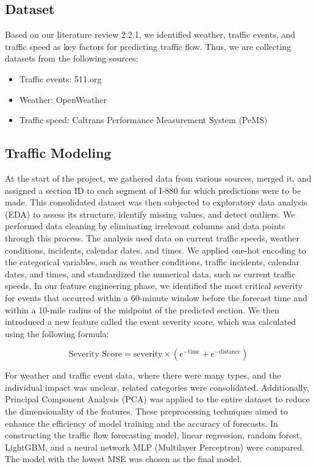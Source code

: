 \documentclass{report}
\begin{document}
\subsection{Dataset}
Based on our literature review 2.2.1, we identified weather, traffic events, and traffic speed as key factors for predicting traffic flow. Thus, we are collecting datasets from the following sources:
\begin{itemize}
    \item Traffic events: 511.org
    \item Weather: OpenWeather
    \item Traffic speed: Caltrans Performance Measurement System (PeMS)
\end{itemize}

\subsection{Traffic Modeling}
At the start of the project, we gathered data from various sources, merged it, and assigned a section ID to each segment of I-880 for which predictions were to be made. This consolidated dataset was then subjected to exploratory data analysis (EDA) to assess its structure, identify missing values, and detect outliers. We performed data cleaning by eliminating irrelevant columns and data points through this process. The analysis used data on current traffic speeds, weather conditions, incidents, calendar dates, and times. We applied one-hot encoding to the categorical variables, such as weather conditions, traffic incidents, calendar dates, and times, and standardized the numerical data, such as current traffic speeds.
In our feature engineering phase, we identified the most critical severity for events that occurred within a 60-minute window before the forecast time and within a 10-mile radius of the midpoint of the predicted section. We then introduced a new feature called the event severity score, which was calculated using the following formula:

\begin{equation}
    \text{Severity Score} = \text{severity} \times \left( e^{-\text{time}} + e^{-\text{distance}} \right)
\end{equation}

For weather and traffic event data, where there were many types, and the individual impact was unclear, related categories were consolidated. Additionally, Principal Component Analysis (PCA) was applied to the entire dataset to reduce the dimensionality of the features. These preprocessing techniques aimed to enhance the efficiency of model training and the accuracy of forecasts.
In constructing the traffic flow forecasting model, linear regression, random forest, LightGBM, and a neural network MLP (Multilayer Perceptron) were compared. The model with the lowest MSE was chosen as the final model.
\end{document}
